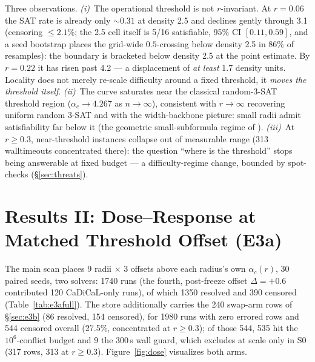 \documentclass[pdflatex,sn-basic,Numbered]{sn-jnl}
\newcommand{\ac}[1]{\ensuremath{\alpha_c(#1)}}
\begin{document}
Three observations. \emph{(i)}~The operational threshold is not
$r$-invariant. At $r=0.06$ the SAT rate is already only ${\sim}0.31$ at
density 2.5 and declines gently through 3.1 (censoring $\le2.1\%$; the 2.5
cell itself is 5/16 satisfiable, 95\% CI $[0.11,0.59]$, and a seed bootstrap
places the grid-wide $0.5$-crossing below density 2.5 in 86\% of resamples):
the boundary is bracketed below density 2.5 at the point estimate. By
$r=0.22$ it has risen past 4.2
--- a displacement of \emph{at least} 1.7 density units. Locality does not
merely re-scale difficulty around a fixed threshold, it \emph{moves the
threshold itself}. \emph{(ii)}~The curve saturates near the classical
random-3-SAT threshold region \citep{mezard2002} ($\alpha_c \to 4.267$ as $n\to\infty$),
consistent with $r\to\infty$ recovering uniform random 3-SAT and with the
width-backbone picture: small radii admit satisfiability far below it (the
geometric small-subformula regime of \citep{blasius2022}). \emph{(iii)}~At $r\ge0.3$,
near-threshold instances collapse out of measurable range (313 walltimeouts
concentrated there): the question ``where is the threshold'' stops being
answerable at fixed budget --- a difficulty-regime change, bounded by
spot-checks (\S\ref{sec:threats}).

\section{Results II: Dose--Response at Matched Threshold Offset (E3a)}
\label{sec:e3a}

The main scan places 9 radii $\times$ 3 offsets above each radius's own
$\ac{r}$, 30 paired seeds, two solvers: 1740 runs (the fourth, post-freeze
offset $\Delta{=}{+}0.6$ contributed 120 CaDiCaL-only runs), of which 1350
resolved and 390 censored (Table~\ref{tab:e3afull}). The store additionally carries
the 240 swap-arm rows of \S\ref{sec:e3b} (86 resolved, 154 censored), for
1980 runs with zero errored rows and 544 censored overall (27.5\%,
concentrated at $r\ge0.3$); of those 544, 535 hit the $10^6$-conflict
budget and 9 the $300$\,s wall guard, which excludes at scale only in S0
(317 rows, 313 at $r\ge0.3$). Figure~\ref{fig:dose}
visualizes both arms.
\end{document}
